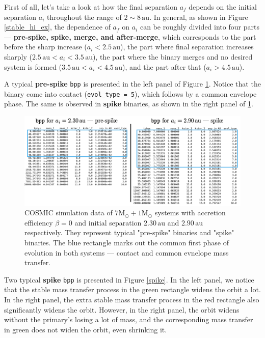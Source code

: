 \documentclass[12pt]{article}
\newcommand{\Msun}{\mathrm{M_{\odot}}}
\newcommand{\au}{\, \mathrm{au}}
\begin{document}
First of all, let's take a look at how the final separation $a_f$ depends on the initial separation $a_i$ throughout the range of $2 \sim 8 \au$. In general, as shown in Figure \ref{stable_hi_ex}, the dependence of $a_f$ on $a_i$ can be roughly divided into four parts — \textbf{pre-spike, spike, merge, and after-merge}, which corresponds to the part before the sharp increase ($a_i < 2.5 \au$), the part where final separation increases sharply ($2.5 \au < a_i < 3.5 \au$), the part where the binary merges and no desired system is formed ($3.5 \au < a_i < 4.5 \au$), and the part after that ($a_i > 4.5 \au$).

A typical \textbf{pre-spike} \verb|bpp| is presented in the left panel of Figure \ref{pre-spike-spike}. Notice that the binary come into contact (\verb|evol_type = 5|), which follows by a common envelope phase. The same is observed in \textbf{spike} binaries, as shown in the right panel of \ref{pre-spike-spike}.

\begin{figure}
    \centering
    \includegraphics[width=\linewidth]{pre-spike-spike.png}
    \caption{COSMIC simulation data of $7 \Msun + 1 \Msun$ systems with accretion efficiency $\beta = 0$ and initial separation $2.30 \au$ and $2.90 \au$ respectively. They represent typical "pre-spike" binaries and "spike" binaries. The blue rectangle marks out the common first phase of evolution in both systems — contact and common evnelope mass transfer.}
    \label{pre-spike-spike}
\end{figure}

Two typical \textbf{spike} \verb|bpp| is presented in Figure \ref{spike}. In the left panel, we notice that the stable mass transfer process in the green rectangle widens the orbit a lot. In the right panel, the extra stable mass transfer process in the red rectangle also significantly widens the orbit. However, in the right panel, the orbit widens without the primary's losing a lot of mass, and the corresponding mass transfer in green does not widen the orbit, even shrinking it.
\end{document}
